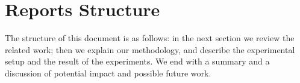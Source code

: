 \section{Reports Structure}
The structure of this document is as follows: in the next section we review the related work; then we explain our methodology, and describe the experimental setup and the result of the experiments. We end with a summary and a discussion of potential impact and possible future work.
